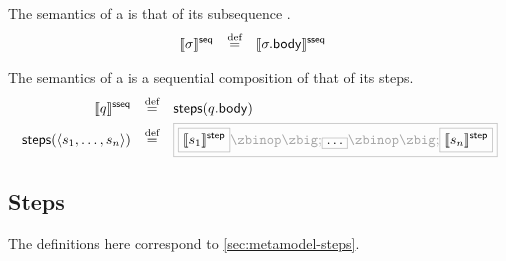\begin{definition}[\msequence]

The semantics of a \msequence{} is that of its subsequence
.
%
\begin{align*}
	\llbracket \sigma \rrbracket^{\mathsf{seq}}
\quad\mathbin{\overset{\text{def}}=}\quad&	
	\llbracket \sigma.\mathsf{body} \rrbracket^{\mathsf{sseq}}
\end{align*}

\end{definition}

\begin{definition}[\msubsequence]

The semantics of a \msubsequence{} is a sequential composition of that of its steps.
%
\begin{align*}
	\sseqsema{\asseq}
	\quad\defeq\quad&	
	\funcname{steps}(\field{\asseq}{body})
\\
	\funcname{steps}(\langle \astep_1, \dotsc, \astep_n \rangle)
	\quad\defeq\quad&	
	\tlang{
	\olang{\stepsema{\astep_1}}
	\circseq
	\olang{\dotso}
	\circseq
	\olang{\stepsema{\astep_n}}
	}
\end{align*}

\end{definition}

\subsection{Steps}\label{ssec:semantics-tockcsp-steps}

The definitions here correspond to \cref{sec:metamodel-steps}.

